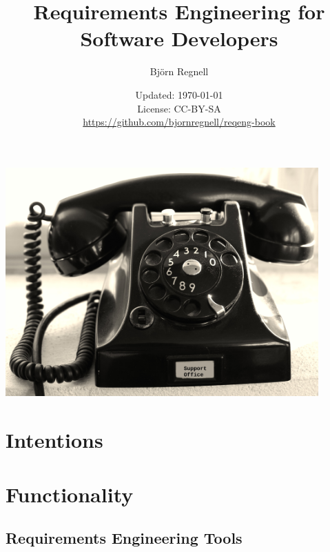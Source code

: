 \documentclass{reqengbook}
\title{
\bf\sffamily\fontsize{22}{28}\selectfont
Requirements Engineering for Software Developers
}
\author{\sffamily\fontsize{20}{30}\selectfont Björn Regnell}
\date{\vspace{2em}\sffamily\small Updated: \today 
\\ License: CC-BY-SA 
\\ \url{https://github.com/bjornregnell/reqeng-book} 
}
\begin{document}

\begin{minipage}{0.5\textwidth}
  \maketitle%
\end{minipage}%
\begin{minipage}{0.5\textwidth}
  \centering\vspace{2.2cm}
  \includegraphics[width=0.9\textwidth]{../img/phone-support.jpg}%
\end{minipage}%
\pagebreak

\setcounter{tocdepth}{2}

\begin{multicols*}{3}  %
\fontsize{8.5}{11}\selectfont

\tableofcontents
\end{multicols*}


\part{Intentions}





\part{Functionality}

\chapter{Requirements Engineering Tools}
\end{document}
